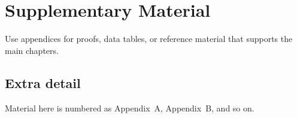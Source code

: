 \chapter{Supplementary Material}
\label{app:supplement}

Use appendices for proofs, data tables, or reference material that supports the main chapters.

\section{Extra detail}
Material here is numbered as Appendix~A, Appendix~B, and so on.
